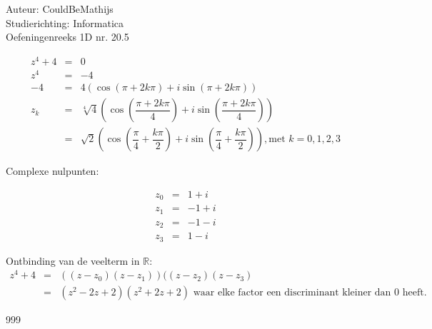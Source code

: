 \documentclass[a4paper]{article}
\begin{document}
  
\noindent \large Auteur: CouldBeMathijs \\
\noindent \large Studierichting: Informatica\\
\noindent \large Oefeningenreeks 1D nr. 20.5\\

\medskip

\normalsize

\begin{eqnarray*}
z^4 + 4 &=& 0 \\
z^4 &=& -4 \\
-4 &=& 4\left(\cos(\pi + 2k\pi) + i\sin(\pi + 2k\pi)\right)\\
z_k &=& \sqrt[4]{4}
\left(\cos\left(\dfrac{\pi + 2k\pi}{4}\right) + i\sin\left(\dfrac{\pi + 2k\pi}{4}\right)\right) \\
&=& \sqrt{2}\left(\cos\left(\dfrac{\pi}{4} + \dfrac{k\pi}{2}\right) + i\sin\left(\dfrac{\pi}{4} + \dfrac{k\pi}{2}\right) \right), \text{met } k=0,1,2,3
\end{eqnarray*}

Complexe nulpunten:

\begin{eqnarray*}
z_0 &=& 1 + i \\
z_1 &=& -1 + i \\
z_2 &=& -1 - i \\
z_3 &=& 1 - i
\end{eqnarray*}

Ontbinding van de veelterm in $\mathbb{R}$:\\

\begin{eqnarray*}
    z^4 + 4 &=& ((z-z_0) (z-z_1)) ((z-z_2) (z-z_3)\\
    &=& (z^2 - 2z + 2)(z^2 + 2z + 2) \text{ waar elke factor een discriminant kleiner dan 0 heeft.}
\end{eqnarray*}




\begin{thebibliography}{999}
\end{thebibliography}
\end{document}
